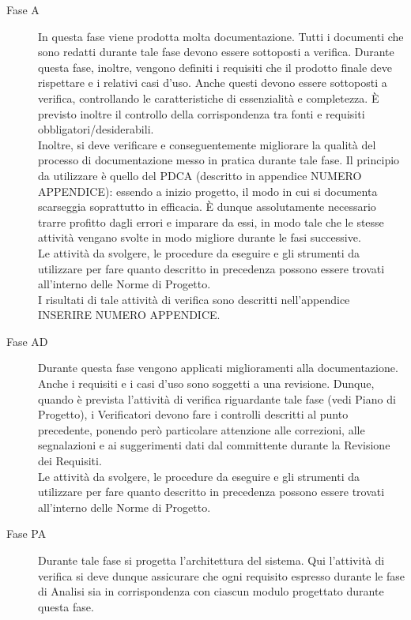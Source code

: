 		\begin{description}
			\item[Fase A] In questa fase viene prodotta molta documentazione. Tutti i documenti che sono redatti durante tale fase devono essere 
			sottoposti a verifica. Durante questa fase, inoltre, vengono definiti i requisiti che il prodotto finale deve rispettare e i relativi casi 
			d'uso. Anche questi devono essere sottoposti a verifica, controllando le caratteristiche di essenzialità e completezza. È previsto inoltre 
			il controllo della corrispondenza tra fonti e requisiti obbligatori/desiderabili.\\
			Inoltre, si deve verificare e conseguentemente migliorare la qualità del processo di documentazione messo in pratica durante tale fase. Il 
			principio da utilizzare è quello del PDCA (descritto in appendice NUMERO APPENDICE): essendo a inizio progetto, il modo in cui si documenta 
			scarseggia soprattutto in efficacia. È dunque assolutamente necessario trarre profitto dagli errori e imparare da essi, in modo tale che le 
			stesse attività vengano svolte in modo migliore durante le fasi successive.\\
			Le attività da svolgere, le procedure da eseguire e gli strumenti da utilizzare per fare quanto descritto in precedenza possono essere trovati 
			all'interno delle Norme di Progetto.\\
			I risultati di tale attività di verifica sono descritti nell'appendice INSERIRE NUMERO APPENDICE.
			\item[Fase AD] Durante questa fase vengono applicati miglioramenti alla documentazione. Anche i requisiti e i casi d'uso 
			sono soggetti a una revisione. Dunque, quando è prevista l'attività di verifica riguardante tale fase (vedi Piano di Progetto), i Verificatori 
			devono fare i controlli descritti al punto precedente, ponendo però particolare attenzione alle correzioni, alle segnalazioni e ai suggerimenti 
			dati dal committente durante la Revisione dei Requisiti.\\
			Le attività da svolgere, le procedure da eseguire e gli strumenti da utilizzare per fare quanto descritto in precedenza possono essere trovati 
			all'interno delle Norme di Progetto.
			\item[Fase PA] Durante tale fase si progetta l'architettura del sistema. Qui l'attività di verifica si deve dunque assicurare che ogni requisito 
			espresso durante le fase di Analisi sia in corrispondenza con ciascun modulo progettato durante questa fase.\\

\end{description}
